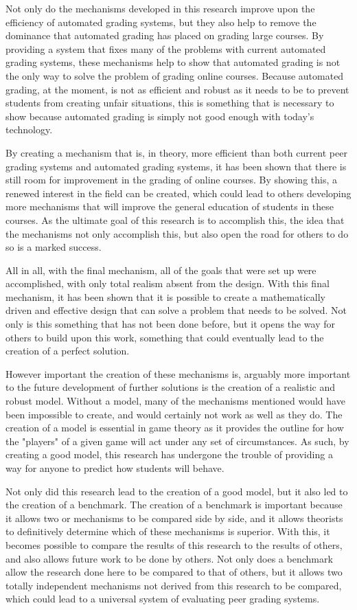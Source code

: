 \documentclass[12pt, Arial]{article}
\begin{document}
Not only do the mechanisms developed in this research improve upon the efficiency of automated grading systems, but they also help to remove the dominance that automated grading has placed on grading large courses. By providing a system that fixes many of the problems with current automated grading systems, these mechanisms help to show that automated grading is not the only way to solve the problem of grading online courses. Because automated grading, at the moment, is not as efficient and robust as it needs to be to prevent students from creating unfair situations, this is something that is necessary to show because automated grading is simply not good enough with today's technology.

By creating a mechanism that is, in theory, more efficient than both current peer grading systems and automated grading systems, it has been shown that there is still room for improvement in the grading of online courses. By showing this, a renewed interest in the field can be created, which could lead to others developing more mechanisms that will improve the general education of students in these courses. As the ultimate goal of this research is to accomplish this, the idea that the mechanisms not only accomplish this, but also open the road for others to do so is a marked success.

All in all, with the final mechanism, all of the goals that were set up were accomplished, with only total realism absent from the design. With this final mechanism, it has been shown that it is possible to create a mathematically driven and effective design that can solve a problem that needs to be solved. Not only is this something that has not been done before, but it opens the way for others to build upon this work, something that could eventually lead to the creation of a perfect solution. 

However important the creation of these mechanisms is, arguably more important to the future development of further solutions is the creation of a realistic and robust model. Without a model, many of the mechanisms mentioned would have been impossible to create, and would certainly not work as well as they do. The creation of a model is essential in game theory as it provides the outline for how the "players" of a given game will act under any set of circumstances. As such, by creating a good model, this research has undergone the trouble of providing a way for anyone to predict how students will behave. 

Not only did this research lead to the creation of a good model, but it also led to the creation of a benchmark. The creation of a benchmark is important because it allows two or mechanisms to be compared side by side, and it allows theorists to definitively determine which of these mechanisms is superior. With this, it becomes possible to compare the results of this research to the results of others, and also allows future work to be done by others. Not only does a benchmark allow the research done here to be compared to that of others, but it allows two totally independent mechanisms not derived from this research to be compared, which could lead to a universal system of evaluating peer grading systems.
\end{document}
